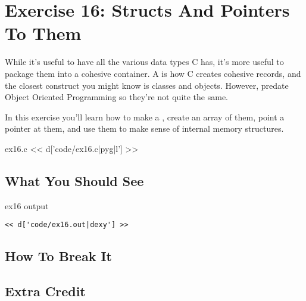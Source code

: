 \chapter{Exercise 16: Structs And Pointers To Them}

While it's useful to have all the various data types C has,
it's more useful to package them into a cohesive container.
A  is how C creates cohesive records, and the
closest construct you might know is classes and objects.  However,
 predate Object Oriented Programming so they're
not quite the same.

In this exercise you'll learn how to make a ,
create an array of them, point a pointer at them, and use them
to make sense of internal memory structures.


\begin{code}{ex16.c}
<< d['code/ex16.c|pyg|l'] >>
\end{code}

\section{What You Should See}

\begin{code}{ex16 output}
\begin{lstlisting}
<< d['code/ex16.out|dexy'] >>
\end{lstlisting}
\end{code}

\section{How To Break It}


\section{Extra Credit}

